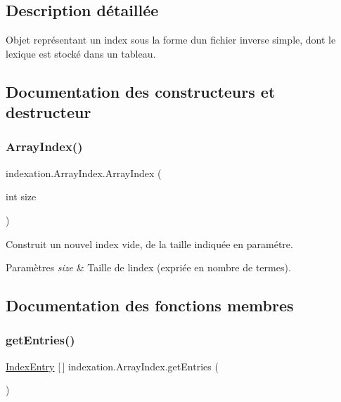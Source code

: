 \subsection{Description détaillée}
Objet représentant un index sous la forme d\textquotesingle{}un fichier inverse simple, dont le lexique est stocké dans un tableau. 

\subsection{Documentation des constructeurs et destructeur}
\mbox{\label{classindexation_1_1ArrayIndex_a793141160f09fb4d93f2a62151b90b1f}} 
\subsubsection{\texorpdfstring{Array\+Index()}{ArrayIndex()}}
{\footnotesize\ttfamily indexation.\+Array\+Index.\+Array\+Index (\begin{DoxyParamCaption}\item[{int}]{size }\end{DoxyParamCaption})}

Construit un nouvel index vide, de la taille indiquée en paramétre.


\begin{DoxyParams}{Paramètres}
{\em size} & Taille de l\textquotesingle{}index (expriée en nombre de termes). \\
\hline
\end{DoxyParams}


\subsection{Documentation des fonctions membres}
\mbox{\label{classindexation_1_1ArrayIndex_af83b1f92ab5c523376f11443407374ba}} 
\subsubsection{\texorpdfstring{get\+Entries()}{getEntries()}}
{\footnotesize\ttfamily \hyperlink{classindexation_1_1content_1_1IndexEntry}{Index\+Entry} \mbox{[}$\,$\mbox{]} indexation.\+Array\+Index.\+get\+Entries (\begin{DoxyParamCaption}{ }\end{DoxyParamCaption})}

